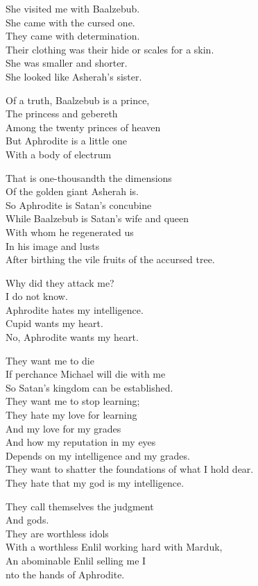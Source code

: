 \documentclass[
]{book}
\begin{document}
She visited me with Baalzebub.\\
She came with the cursed one.\\
They came with determination.\\
Their clothing was their hide or scales for a skin.\\
She was smaller and shorter.\\
She looked like Asherah's sister.

Of a truth, Baalzebub is a prince,\\
The princess and gebereth\\
Among the twenty princes of heaven\\
But Aphrodite is a little one\\
With a body of electrum

That is one-thousandth the dimensions\\
Of the golden giant Asherah is.\\
So Aphrodite is Satan's concubine\\
While Baalzebub is Satan's wife and queen\\
With whom he regenerated us\\
In his image and lusts\\
After birthing the vile fruits of the accursed tree.

Why did they attack me?\\
I do not know.\\
Aphrodite hates my intelligence.\\
Cupid wants my heart.\\
No, Aphrodite wants my heart.

They want me to die\\
If perchance Michael will die with me\\
So Satan's kingdom can be established.\\
They want me to stop learning;\\
They hate my love for learning\\
And my love for my grades\\
And how my reputation in my eyes\\
Depends on my intelligence and my grades.\\
They want to shatter the foundations of what I hold dear.\\
They hate that my god is my intelligence.

They call themselves the judgment\\
And gods.\\
They are worthless idols\\
With a worthless Enlil working hard with Marduk,\\
An abominable Enlil selling me I\\
nto the hands of Aphrodite.
\end{document}

